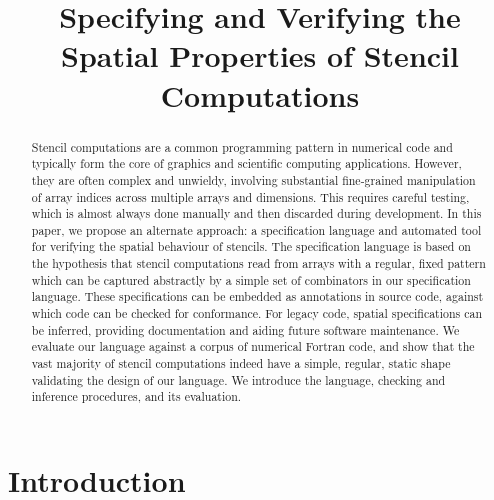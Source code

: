 \documentclass[10pt,preprint]{sigplanconf}
\title{Specifying and Verifying the Spatial Properties of Stencil Computations}
\theoremstyle{definition}
\begin{document}
\maketitle



\begin{abstract}
Stencil computations are a common programming pattern in numerical
  code and typically form the core of graphics and scientific
  computing applications. However, they are often complex and
  unwieldy, involving substantial fine-grained manipulation of array
  indices across multiple arrays and dimensions. This requires careful
  testing, which is almost always done manually and then discarded
  during development. In this paper, we propose an alternate approach:
  a specification language and automated tool for verifying the
  spatial behaviour of stencils. The specification language is based
  on the hypothesis that stencil computations read from arrays with a
  regular, fixed pattern which can be captured abstractly by a simple
  set of combinators in our specification language. These
  specifications can be embedded as annotations in source code,
  against which code can be checked for conformance. For legacy code,
  spatial specifications can be inferred, providing documentation and
  aiding future software maintenance. We evaluate our language against
  a corpus of numerical Fortran code, and show that the vast majority
  of stencil computations indeed have a simple, regular, static shape
  validating the design of our language.  We introduce the
  language, checking and inference procedures, and its evaluation.
\end{abstract}



\section{Introduction}\label{sec:intro}
\end{document}
